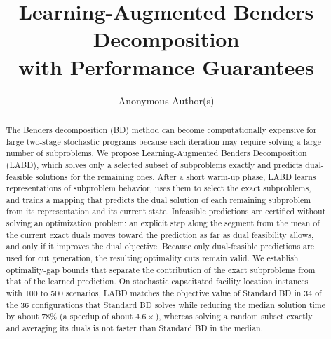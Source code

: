 \documentclass[runningheads]{llncs}
\begin{document}
\title{Learning-Augmented Benders Decomposition\\ with Performance Guarantees}

\author{Anonymous Author(s)}

\maketitle

\begin{abstract}
The Benders decomposition (BD) method can become computationally expensive for large two-stage stochastic programs because each iteration may require solving a large number of subproblems. We propose Learning-Augmented Benders Decomposition (LABD), which solves only a selected subset of subproblems exactly and predicts dual-feasible solutions for the remaining ones. After a short warm-up phase, LABD learns representations of subproblem behavior, uses them to select the exact subproblems, and trains a mapping that predicts the dual solution of each remaining subproblem from its representation and its current state. Infeasible predictions are certified without solving an optimization problem: an explicit step along the segment from the mean of the current exact duals moves toward the prediction as far as dual feasibility allows, and only if it improves the dual objective. Because only dual-feasible predictions are used for cut generation, the resulting optimality cuts remain valid. We establish optimality-gap bounds that separate the contribution of the exact subproblems from that of the learned prediction. On stochastic capacitated facility location instances with 100 to 500 scenarios, LABD matches the objective value of Standard BD in 34 of the 36 configurations that Standard BD solves while reducing the median solution time by about 78\% (a speedup of about $4.6\times$), whereas solving a random subset exactly and averaging its duals is not faster than Standard BD in the median.

\end{abstract}
\end{document}
